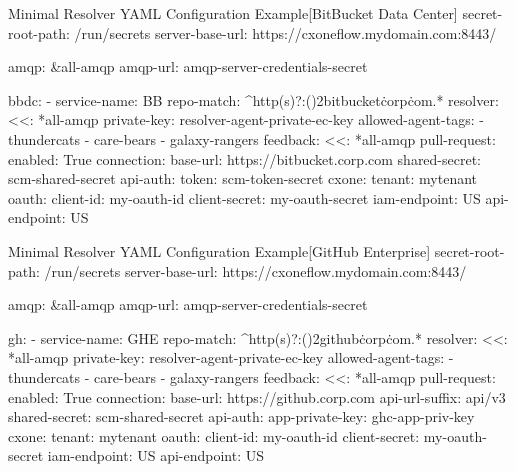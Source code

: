 
\begin{code}{Minimal Resolver YAML Configuration Example}{[BitBucket Data Center]}{}
  secret-root-path: /run/secrets
  server-base-url: https://cxoneflow.mydomain.com:8443/

  amqp: &all-amqp
    amqp-url: amqp-server-credentials-secret

  bbdc:
      - service-name: BB
        repo-match: ^http(s)?:(\/){2}bitbucket\.corp\.com.*
        resolver:
          <<: *all-amqp
          private-key: resolver-agent-private-ec-key
          allowed-agent-tags:
            - thundercats
            - care-bears
            - galaxy-rangers
        feedback:
          <<: *all-amqp
          pull-request:
            enabled: True
        connection:
          base-url: https://bitbucket.corp.com
          shared-secret: scm-shared-secret
          api-auth:
            token: scm-token-secret
        cxone:
          tenant: mytenant
          oauth:
            client-id: my-oauth-id
            client-secret: my-oauth-secret
          iam-endpoint: US
          api-endpoint: US
\end{code}
  


\begin{code}{Minimal Resolver YAML Configuration Example}{[GitHub Enterprise]}{}
  secret-root-path: /run/secrets
  server-base-url: https://cxoneflow.mydomain.com:8443/

  amqp: &all-amqp
    amqp-url: amqp-server-credentials-secret

  gh:
      - service-name: GHE
        repo-match: ^http(s)?:(\/){2}github\.corp\.com.*
        resolver:
          <<: *all-amqp
          private-key: resolver-agent-private-ec-key
          allowed-agent-tags:
            - thundercats
            - care-bears
            - galaxy-rangers
        feedback:
          <<: *all-amqp
          pull-request:
            enabled: True
        connection:
          base-url: https://github.corp.com
          api-url-suffix: api/v3
          shared-secret: scm-shared-secret
          api-auth:
            app-private-key: ghc-app-priv-key
        cxone:
          tenant: mytenant
          oauth:
            client-id: my-oauth-id
            client-secret: my-oauth-secret
          iam-endpoint: US
          api-endpoint: US
\end{code}


